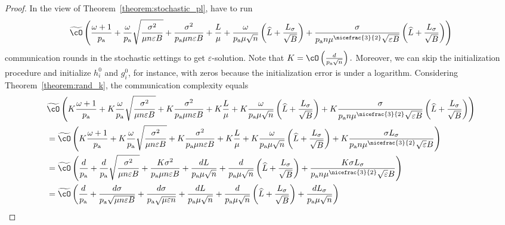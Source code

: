 \documentclass{article}
\newcommand{\algorithmname}{DASHA-PP}
\newcommand*{\probavailable}{\ensuremath{p_{\textnormal{a}}}}
\begin{document}
    \begin{proof}
      In the view of Theorem~\ref{theorem:stochastic_pl}, \algname{\algorithmname} have to run
      \begin{align*}
        \widetilde{\cO}\left(\frac{\omega + 1}{\probavailable} + \frac{\omega}{\probavailable}\sqrt{\frac{\sigma^2}{\mu n \varepsilon B}} + \frac{\sigma^2}{\probavailable \mu n \varepsilon B} + \frac{L}{\mu} + \frac{\omega}{\probavailable \mu \sqrt{n}} \left(\widehat{L} + \frac{L_{\sigma}}{\sqrt{B}}\right) + \frac{\sigma}{\probavailable n \mu^{\nicefrac{3}{2}} \sqrt{\varepsilon B}}\left(\widehat{L} + \frac{L_{\sigma}}{\sqrt{B}}\right)\right)
      \end{align*}
    communication rounds in the stochastic settings to get $\varepsilon$-solution. Note that $K = \cO\left(\frac{d}{\probavailable\sqrt{n}}\right).$ Moreover, we can skip the initialization procedure and initialize $h^0_i$ and $g^0_i$, for instance, with zeros because the initialization error is under a logarithm. Considering Theorem~\ref{theorem:rand_k}, the communication complexity equals 
    \begin{align*}
      &\widetilde{\cO}\left(K\frac{\omega + 1}{\probavailable} + K\frac{\omega}{\probavailable}\sqrt{\frac{\sigma^2}{\mu n \varepsilon B}} + K\frac{\sigma^2}{\probavailable \mu n \varepsilon B} + K\frac{L}{\mu} + K\frac{\omega}{\probavailable \mu \sqrt{n}} \left(\widehat{L} + \frac{L_{\sigma}}{\sqrt{B}}\right) + K\frac{\sigma}{\probavailable n \mu^{\nicefrac{3}{2}} \sqrt{\varepsilon B}}\left(\widehat{L} + \frac{L_{\sigma}}{\sqrt{B}}\right)\right) \\
      &=\widetilde{\cO}\left(K\frac{\omega + 1}{\probavailable} + K\frac{\omega}{\probavailable}\sqrt{\frac{\sigma^2}{\mu n \varepsilon B}} + K\frac{\sigma^2}{\probavailable \mu n \varepsilon B} + K\frac{L}{\mu} + K\frac{\omega}{\probavailable \mu \sqrt{n}} \left(\widehat{L} + \frac{L_{\sigma}}{\sqrt{B}}\right) + K\frac{\sigma L_{\sigma}}{\probavailable n \mu^{\nicefrac{3}{2}} \sqrt{\varepsilon} B}\right) \\
      &= \widetilde{\cO}\left(\frac{d}{\probavailable} + \frac{d}{\probavailable}\sqrt{\frac{\sigma^2}{\mu n \varepsilon B}} + \frac{K \sigma^2}{\probavailable \mu n \varepsilon B} + \frac{d L}{\probavailable \mu \sqrt{n}} + \frac{d}{\probavailable \mu \sqrt{n}} \left(\widehat{L} + \frac{L_{\sigma}}{\sqrt{B}}\right) + \frac{K\sigma L_{\sigma}}{\probavailable n \mu^{\nicefrac{3}{2}} \sqrt{\varepsilon} B}\right) \\
      &= \widetilde{\cO}\left(\frac{d}{\probavailable} + \frac{d \sigma}{\probavailable \sqrt{\mu n \varepsilon B}} + \frac{d \sigma}{\probavailable \sqrt{\mu \varepsilon n}} + \frac{d L}{\probavailable \mu \sqrt{n}} + \frac{d}{\probavailable \mu \sqrt{n}} \left(\widehat{L} + \frac{L_{\sigma}}{\sqrt{B}}\right) + \frac{d L_{\sigma}}{\probavailable \mu \sqrt{n}}\right) \\

\end{align*}
\end{proof}
\end{document}
